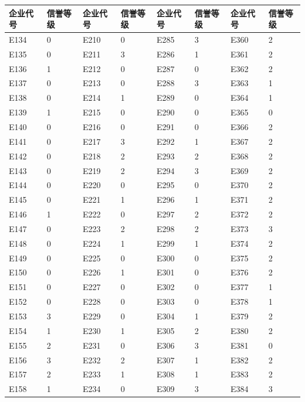 \documentclass[UTF8]{ctexart}
\begin{document}
	\begin{table}[H]
		\centering
		\begin{tabular}{|l|l|l|l|l|l|l|l|}
		\hline
			企业代号 & 信誉等级 & 企业代号 & 信誉等级 & 企业代号 & 信誉等级 & 企业代号 & 信誉等级 \\ \hline
			E134 & 0 & E210 & 0 & E285 & 3 & E360 & 2 \\ \hline
			E135 & 0 & E211 & 3 & E286 & 1 & E361 & 2 \\ \hline
			E136 & 1 & E212 & 0 & E287 & 0 & E362 & 2 \\ \hline
			E137 & 0 & E213 & 0 & E288 & 3 & E363 & 1 \\ \hline
			E138 & 0 & E214 & 1 & E289 & 0 & E364 & 1 \\ \hline
			E139 & 1 & E215 & 0 & E290 & 0 & E365 & 0 \\ \hline
			E140 & 0 & E216 & 0 & E291 & 0 & E366 & 2 \\ \hline
			E141 & 0 & E217 & 3 & E292 & 1 & E367 & 2 \\ \hline
			E142 & 0 & E218 & 2 & E293 & 2 & E368 & 2 \\ \hline
			E143 & 0 & E219 & 2 & E294 & 3 & E369 & 2 \\ \hline
			E144 & 0 & E220 & 0 & E295 & 0 & E370 & 2 \\ \hline
			E145 & 0 & E221 & 1 & E296 & 1 & E371 & 2 \\ \hline
			E146 & 1 & E222 & 0 & E297 & 2 & E372 & 2 \\ \hline
			E147 & 0 & E223 & 2 & E298 & 2 & E373 & 3 \\ \hline
			E148 & 0 & E224 & 1 & E299 & 1 & E374 & 2 \\ \hline
			E149 & 0 & E225 & 0 & E300 & 0 & E375 & 2 \\ \hline
			E150 & 0 & E226 & 1 & E301 & 0 & E376 & 2 \\ \hline
			E151 & 0 & E227 & 0 & E302 & 0 & E377 & 1 \\ \hline
			E152 & 0 & E228 & 0 & E303 & 0 & E378 & 1 \\ \hline
			E153 & 3 & E229 & 0 & E304 & 1 & E379 & 2 \\ \hline
			E154 & 1 & E230 & 1 & E305 & 2 & E380 & 2 \\ \hline
			E155 & 2 & E231 & 0 & E306 & 3 & E381 & 0 \\ \hline
			E156 & 3 & E232 & 2 & E307 & 1 & E382 & 2 \\ \hline
			E157 & 2 & E233 & 1 & E308 & 1 & E383 & 2 \\ \hline
			E158 & 1 & E234 & 0 & E309 & 3 & E384 & 3 \\ \hline

\end{tabular}
\end{table}
\end{document}
